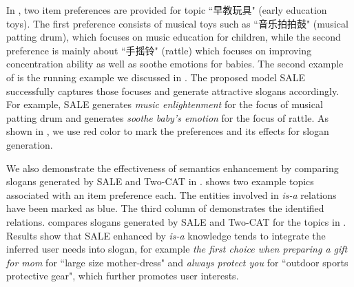 
In , %
two item preferences are provided for topic ``早教玩具" (early education toys).
The first preference consists of musical toys such as ``音乐拍拍鼓" (musical patting drum),
which focuses on music education for children,
while the second preference is mainly about ``手摇铃" (rattle) which focuses on improving concentration ability 
as well as soothe emotions for babies.
The second example of 
 is the running example we discussed in .
The proposed model SALE successfully captures those focuses 
and generate attractive slogans accordingly.
For example, SALE generates \emph{music enlightenment}
for the focus of musical patting drum
and generates \emph{soothe baby's emotion } for the focus of 
rattle.
As shown in , 
we use red color to mark the preferences and its effects for slogan generation.

We also demonstrate the effectiveness of semantics enhancement
by comparing slogans generated by SALE and Two-CAT in .
 shows two example topics associated with an item preference each.
The entities involved in \emph{is-a} relations
have been marked as blue. 
The third column of  demonstrates the 
identified relations.
 compares slogans generated by SALE and Two-CAT
for the topics in .
Results show that SALE enhanced by \emph{is-a} knowledge 
tends to integrate the inferred user needs into slogan,
for example \emph{the first choice when preparing a gift for mom} for ``large size mother-dress"
and \emph{always protect you} for ``outdoor sports protective gear",
which further promotes user interests.


